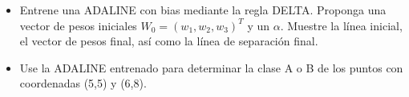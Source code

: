 \begin{itemize}
    \item Entrene una ADALINE con bias mediante la regla DELTA.  Proponga una vector de pesos iniciales $W_0=(w_1,w_2,w_3 )^T$ y un $\alpha$. Muestre la línea inicial, el vector de pesos final, así como la línea de separación final.
	\item Use la ADALINE  entrenado para determinar la clase A o B de los puntos con coordenadas (5,5) y (6,8).
\end{itemize}
